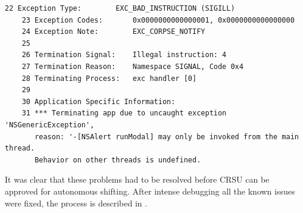 \documentclass[a4paper,10pt]{article}
\begin{document}
{\footnotesize
\begin{Verbatim}[xleftmargin=-8mm]
	22 Exception Type:        EXC_BAD_INSTRUCTION (SIGILL)
	23 Exception Codes:       0x0000000000000001, 0x0000000000000000
	24 Exception Note:        EXC_CORPSE_NOTIFY
	25 
	26 Termination Signal:    Illegal instruction: 4
	27 Termination Reason:    Namespace SIGNAL, Code 0x4
	28 Terminating Process:   exc handler [0]
	29 
	30 Application Specific Information:
	31 *** Terminating app due to uncaught exception 'NSGenericException', 
	   reason: '-[NSAlert runModal] may only be invoked from the main thread.
	   Behavior on other threads is undefined.
\end{Verbatim}
}

It was clear that these problems had to be resolved before CRSU can be approved for autonomous shifting. After intense debugging all the known issues were fixed, the process is described in .

\end{document}
